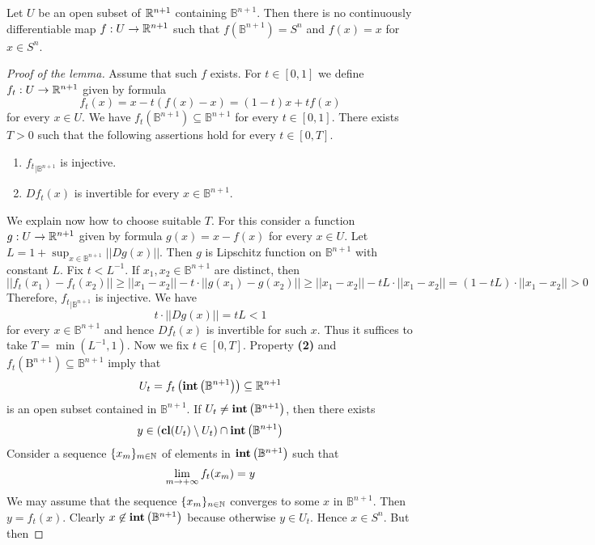 \begin{lemma}\label{lemma:thereisnodifferentiableretraction}
Let $U$ be an open subset of ${\mathbb R}^{n+1}$ containing $\mathbb{B}^{n+1}$. Then there is no continuously differentiable map $f:U\rightarrow {\mathbb R}^{n+1}$ such that $f(\mathbb{B}^{n+1}) = S^{n}$ and $f(x) = x$ for $x\in S^n$. 
\end{lemma}
\begin{proof}[Proof of the lemma]
Assume that such $f$ exists. For $t\in [0,1]$ we define $f_t:U\rightarrow {\mathbb R}^{n+1}$ given by formula
$$f_t(x) = x - t(f(x) - x) = (1-t)x + tf(x)$$
for every $x\in U$. We have $f_t\left(\mathbb{B}^{n+1}\right) \subseteq \mathbb{B}^{n+1}$ for every $t\in [0,1]$. There exists $T>0$ such that the following assertions hold for every $t\in [0,T]$.
\begin{enumerate}[label=\textbf{(\arabic*)}, leftmargin=3.0em]
\item ${f_t}_{\mid \mathbb{B}^{n+1}}$ is injective.
\item $Df_t(x)$ is invertible for every $x\in \mathbb{B}^{n+1}$.
\end{enumerate}
We explain now how to choose suitable $T$. For this consider a function $g:U\rightarrow {\mathbb R}^{n+1}$ given by formula $g(x)= x - f(x)$ for every $x\in U$. Let $L = 1 + \sup_{x\in \mathbb{B}^{n+1}}||Dg(x)||$. Then $g$ is Lipschitz function on $\mathbb{B}^{n+1}$ with constant $L$. Fix $t < L^{-1}$. If $x_1,x_2\in \mathbb{B}^{n+1}$ are distinct, then
$$||f_t(x_1) - f_t(x_2)|| \geq ||x_1-x_2|| - t\cdot ||g(x_1) - g(x_2)|| \geq ||x_1 - x_2|| - tL\cdot ||x_1 - x_2|| = \left(1 - tL\right)\cdot ||x_1 - x_2|| > 0 $$
Therefore, ${f_t}_{\mid \mathbb{B}^{n+1}}$ is injective. We have
$$t\cdot ||Dg(x)|| = tL < 1$$
for every $x\in \mathbb{B}^{n+1}$ and hence $Df_t(x)$ is invertible for such $x$. Thus it suffices to take $T = \min \left(L^{-1}, 1 \right)$. Now we fix $t\in [0,T]$. Property \textbf{(2)} and $f_t\left(\mathrm{B}^{n+1}\right) \subseteq  \mathbb{B}^{n+1}$ imply that
$$U_t = f_t\left(\mathbf{int}\left(\mathbb{B}^{n+1}\right)\right)\subseteq {\mathbb R}^{n+1}$$
is an open subset contained in $\mathbb{B}^{n+1}$. If $U_t \neq \mathbf{int}\left(\mathbb{B}^{n+1}\right)$, then there exists
$$y \in \left(\mathbf{cl}(U_t) \setminus U_t\right) \cap \mathbf{int}\left(\mathbb{B}^{n+1}\right)$$
Consider a sequence $\{x_m\}_{m\in {\mathbb N}}$ of elements in $\mathbf{int}\left(\mathbb{B}^{n+1}\right)$ such that
$$\lim_{m\rightarrow +\infty}f_t(x_m) = y$$
We may assume that the sequence $\{x_m\}_{n\in {\mathbb N}}$ converges to some $x$ in $\mathbb{B}^{n+1}$. Then $y = f_t(x)$. Clearly $x \not \in \mathbf{int}\left(\mathbb{B}^{n+1}\right)$ because otherwise $y \in U_t$. Hence $x\in S^n$. But then

\end{proof}
